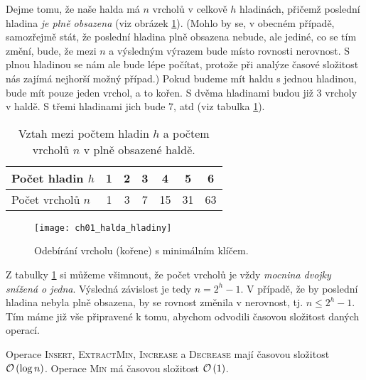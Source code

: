 Dejme tomu, že naše halda má $n$ vrcholů v celkově $h$ hladinách, přičemž poslední hladina \emph{je plně obsazena} (viz obrázek \ref{fig:halda_hladiny}). (Mohlo by se, v obecném případě, samozřejmě stát, že poslední hladina plně obsazena nebude, ale jediné, co se tím změní, bude, že mezi $n$ a výsledným výrazem bude místo rovnosti nerovnost. S plnou hladinou se nám ale bude lépe počítat, protože při analýze časové složitost nás zajímá nejhorší možný případ.) Pokud budeme mít haldu s jednou hladinou, bude mít pouze jeden vrchol, a to kořen. S dvěma hladinami budou již 3 vrcholy v haldě. S třemi hladinami jich bude 7, atd (viz tabulka \ref{tab:halda_vrcholy_hladiny}).
\begin{table}[h]
    \centering
    \begin{tabular}{|l|c|c|c|c|c|c|}
        \hline
        Počet hladin $h$  & 1 & 2 & 3 & 4  & 5  & 6  \\ \hline
        Počet vrcholů $n$ & 1 & 3 & 7 & 15 & 31 & 63 \\ \hline
    \end{tabular}
    \caption{Vztah mezi počtem hladin $h$ a počtem vrcholů $n$ v plně obsazené haldě.}
    \label{tab:halda_vrcholy_hladiny}
\end{table}
\begin{figure}[h]
    \centering
    \texttt{[image: ch01\_halda\_hladiny]}
    \caption{Odebírání vrcholu (kořene) s minimálním klíčem.}
    \label{fig:halda_hladiny}
\end{figure}
Z tabulky \ref{tab:halda_vrcholy_hladiny} si můžeme všimnout, že počet vrcholů je vždy \emph{mocnina dvojky snížená o jedna}. Výsledná závislost je tedy $n=2^h-1$. V případě, že by poslední hladina nebyla plně obsazena, by se rovnost změnila v nerovnost, tj. $n\leqslant2^h-1$. Tím máme již vše připravené k tomu, abychom odvodili časovou složitost daných operací.
\begin{theorem}
    Operace \textsc{Insert}, \textsc{ExtractMin}, \textsc{Increase} a \textsc{Decrease} mají časovou složitost $\mathcal{O}\left(\log{n}\right)$. Operace \textsc{Min} má časovou složitost $\mathcal{O}\left(1\right)$.
\end{theorem}
